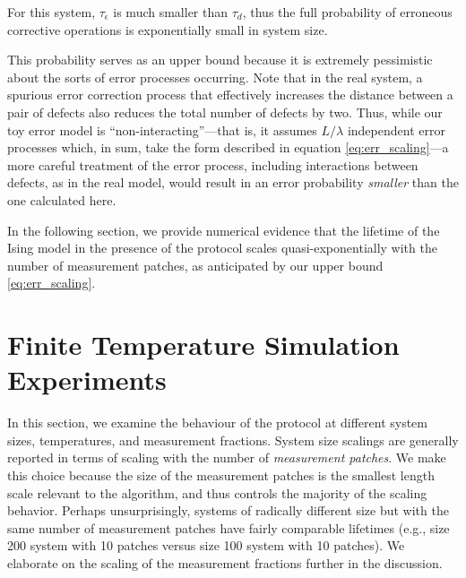 \documentclass[twocolumn,superscriptaddress,aps,prb,floatfix]{revtex4-1}
\begin{document}
For this system, $\tau_{\epsilon}$ is much smaller than $\tau_d$, thus the full probability of erroneous corrective operations is exponentially small in system size.
 
 This probability serves as an upper bound because it is extremely pessimistic about the sorts of error processes occurring.  Note that in the real system, a spurious error correction process that effectively increases the distance between a pair of defects also reduces the total number of defects by two.  Thus, while our toy error model is ``non-interacting''---that is, it assumes $L/\lambda$ independent error processes which, in sum, take the form described in equation \ref{eq:err_scaling}---a more careful treatment of the error process, including interactions between defects, as in the real model, would result in an error probability \emph{smaller} than the one calculated here.
 
 In the following section, we provide numerical evidence that the lifetime of the Ising model in the presence of the protocol scales quasi-exponentially with the number of measurement patches, as anticipated by our upper bound \ref{eq:err_scaling}.
 

 
\section{Finite Temperature Simulation Experiments}
\label{sec:experiments}

In this section, we examine the behaviour of the protocol at different system sizes, temperatures, and measurement fractions.  System size scalings are generally reported in terms of scaling with the number of \emph{measurement patches}.  We make this choice because the size of the measurement patches is the smallest length scale relevant to the algorithm, and thus controls the majority of the scaling behavior.  Perhaps unsurprisingly, systems of radically different size but with the same number of measurement patches have fairly comparable lifetimes (e.g., size 200 system with 10 patches versus size 100 system with 10 patches).  We elaborate on the scaling of the measurement fractions further in the discussion.
\end{document}
